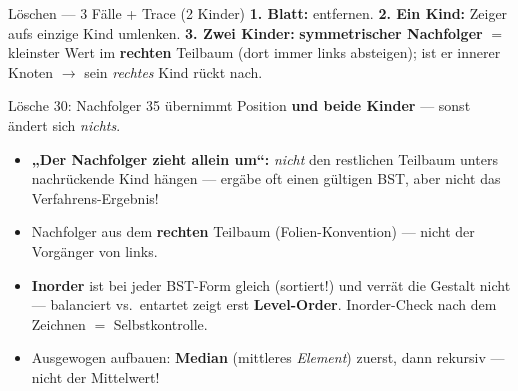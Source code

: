 \documentclass[10pt,a4paper]{article}
\begin{document}
\begin{defbox}{Löschen — 3 Fälle + Trace (2 Kinder)}
\small
\textbf{1. Blatt:} entfernen. \quad \textbf{2. Ein Kind:} Zeiger aufs einzige Kind umlenken.
\quad \textbf{3. Zwei Kinder:} \textbf{symmetrischer Nachfolger} $=$ kleinster Wert im
\textbf{rechten} Teilbaum (dort immer links absteigen); ist er innerer Knoten $\to$ sein
\emph{rechtes} Kind rückt nach.
\par\vspace{3pt}\centering
{}
\hspace{4mm}{\Large$\Rightarrow$}\hspace{4mm}
\par\vspace{2pt}\raggedright
Lösche \textcolor{pitred}{30}: Nachfolger \textcolor{tipgreen}{35} übernimmt Position
\textbf{und beide Kinder} — sonst ändert sich \emph{nichts}.
\end{defbox}

\begin{fallenbox}
\small\begin{itemize}
  \item \textbf{„Der Nachfolger zieht allein um``:} \emph{nicht} den restlichen Teilbaum unters
        nachrückende Kind hängen — ergäbe oft einen gültigen BST, aber nicht das Verfahrens-Ergebnis!
  \item Nachfolger aus dem \textbf{rechten} Teilbaum (Folien-Konvention) — nicht der Vorgänger von links.
  \item \textbf{Inorder} ist bei jeder BST-Form gleich (sortiert!) und verrät die Gestalt nicht —
        balanciert vs.\ entartet zeigt erst \textbf{Level-Order}. Inorder-Check nach dem Zeichnen
        $=$ Selbstkontrolle.
  \item Ausgewogen aufbauen: \textbf{Median} (mittleres \emph{Element}) zuerst, dann rekursiv —
        nicht der Mittelwert!
\end{itemize}
\end{fallenbox}
\end{document}
